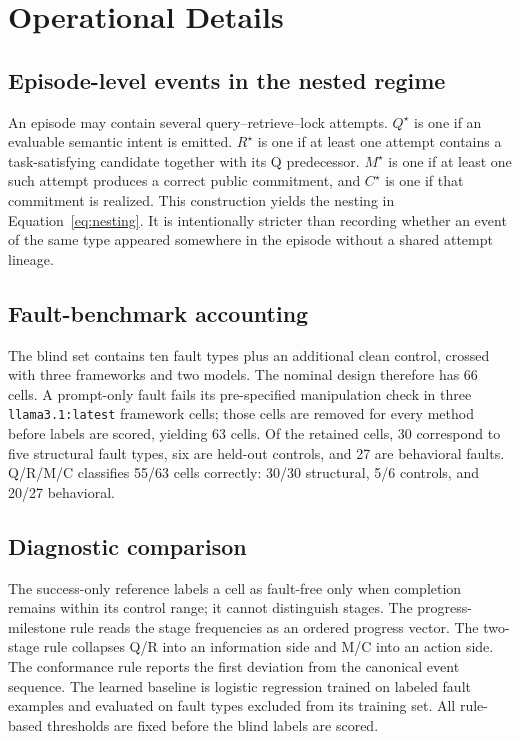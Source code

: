 \documentclass{article}
\newcommand{\qrmc}{Q/R/M/C}
\newcommand{\Qstar}{Q^{\star}}
\newcommand{\Rstar}{R^{\star}}
\newcommand{\Mstar}{M^{\star}}
\newcommand{\Cstar}{C^{\star}}
\begin{document}



\appendix

\section{Operational Details}

\subsection{Episode-level events in the nested regime}
An episode may contain several query--retrieve--lock attempts. $\Qstar$ is one if an evaluable semantic intent is emitted. $\Rstar$ is one if at least one attempt contains a task-satisfying candidate together with its Q predecessor. $\Mstar$ is one if at least one such attempt produces a correct public commitment, and $\Cstar$ is one if that commitment is realized. This construction yields the nesting in Equation~\ref{eq:nesting}. It is intentionally stricter than recording whether an event of the same type appeared somewhere in the episode without a shared attempt lineage.

\subsection{Fault-benchmark accounting}
The blind set contains ten fault types plus an additional clean control, crossed with three frameworks and two models. The nominal design therefore has 66 cells. A prompt-only fault fails its pre-specified manipulation check in three \texttt{llama3.1:latest} framework cells; those cells are removed for every method before labels are scored, yielding 63 cells. Of the retained cells, 30 correspond to five structural fault types, six are held-out controls, and 27 are behavioral faults. \qrmc{} classifies 55/63 cells correctly: 30/30 structural, 5/6 controls, and 20/27 behavioral.

\subsection{Diagnostic comparison}
The success-only reference labels a cell as fault-free only when completion remains within its control range; it cannot distinguish stages. The progress-milestone rule reads the stage frequencies as an ordered progress vector. The two-stage rule collapses Q/R into an information side and M/C into an action side. The conformance rule reports the first deviation from the canonical event sequence. The learned baseline is logistic regression trained on labeled fault examples and evaluated on fault types excluded from its training set. All rule-based thresholds are fixed before the blind labels are scored.
\end{document}
